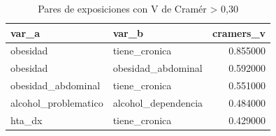 \begin{table}[htbp]
\caption{Pares de exposiciones con V de Cramér > 0,30}
\label{tab:tabla_05b_colinealidad}
\begin{tabular}{llr}
\toprule
var\_a & var\_b & cramers\_v \\
\midrule
obesidad & tiene\_cronica & 0.855000 \\
obesidad & obesidad\_abdominal & 0.592000 \\
obesidad\_abdominal & tiene\_cronica & 0.551000 \\
alcohol\_problematico & alcohol\_dependencia & 0.484000 \\
hta\_dx & tiene\_cronica & 0.429000 \\
\bottomrule
\end{tabular}
\end{table}
